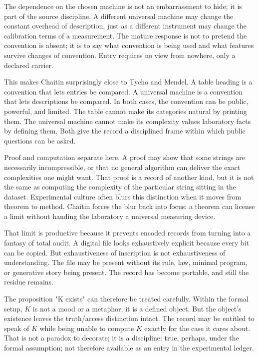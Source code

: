 The dependence on the chosen machine is not an embarrassment to hide; it
is part of the source discipline. A different universal machine may
change the constant overhead of description, just as a different
instrument may change the calibration terms of a measurement. The mature
response is not to pretend the convention is absent; it is to say what
convention is being used and what features survive changes of convention.
Entry requires no view from nowhere, only a declared carrier.

This makes Chaitin surprisingly close to Tycho and Mendel. A table
heading is a convention that lets entries be compared. A universal
machine is a convention that lets descriptions be compared. In both
cases, the convention can be public, powerful, and limited. The table
cannot make its categories natural by printing them. The universal
machine cannot make its complexity values laboratory facts by defining
them. Both give the record a disciplined frame within which public
questions can be asked.

Proof and computation separate here. A proof may show that some strings
are necessarily incompressible, or that no general algorithm can deliver
the exact complexities one might want. That proof is a record of another
kind, but it is not the same as computing the complexity of the
particular string sitting in the dataset. Experimental culture often
blurs this distinction when it moves from theorem to method. Chaitin
forces the blur back into focus: a theorem can license a limit without
handing the laboratory a universal measuring device.

That limit is productive because it prevents encoded records from turning
into a fantasy of total audit. A digital file looks exhaustively explicit
because every bit can be copied. But exhaustiveness of inscription is not
exhaustiveness of understanding. The file may be present without its
rule, law, minimal program, or generative story being present. The
record has become portable, and still the residue remains.

The proposition "K exists" can therefore be treated carefully. Within the
formal setup, \(K\) is not a mood or a metaphor; it is a defined object.
But the object's existence leaves the truth/access distinction intact.
The record may be entitled to speak of \(K\) while being unable to
compute \(K\) exactly for the case it cares about. That is not a paradox
to decorate; it is a discipline: true, perhaps, under the formal
assumption; not therefore available as an entry in the experimental
ledger.

